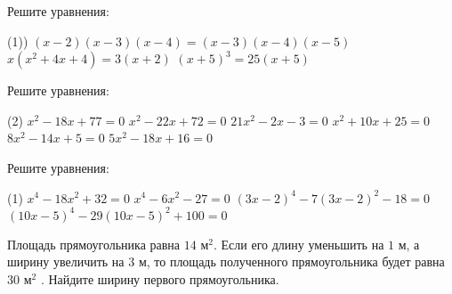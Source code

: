 %
%

\begin{class}[number=1]
	\begin{listofex}
		\item Решите уравнения: \begin{tasks}(1))
			\task \( (x-2)(x-3)(x-4)= (x-3)(x-4)(x-5) \)
			\task \( x(x^{2}+4x+4)=3(x+2) \)
			\task \( (x+5)^{3}=25(x+5)\)
		\end{tasks} 
		\item Решите уравнения: 
		\begin{tasks}(2)
			\task \( x^{2}-18x+77=0 \)
			\task \( x^{2}-22x+72=0 \)
			\task \( 21x^{2}-2x-3=0 \)
			\task \( x^{2}+10x+25=0 \)
			\task \( 8x^{2}-14x+5=0 \)
			\task \( 5x^{2}-18x+16=0 \)
		\end{tasks}
		\item Решите уравнения: 
		\begin{tasks}(1)
			\task \( x^{4}-18x^{2}+32=0 \)
			\task \( x^{4}-6x^{2}-27=0 \)
			\task \( (3x-2)^{4}-7(3x-2)^{2}-18=0 \)
			\task \( (10x-5)^{4}-29(10x-5)^{2}+100=0 \)
		\end{tasks}
		
	\item Площадь прямоугольника равна \( 14 \) м\( ^{2} \). Если его длину уменьшить на \( 1 \) м, а ширину увеличить на \( 3 \) м, то площадь полученного прямоугольника будет равна \( 30 \) м\( ^{2} \) . Найдите ширину первого прямоугольника.
	\end{listofex}
\end{class}

